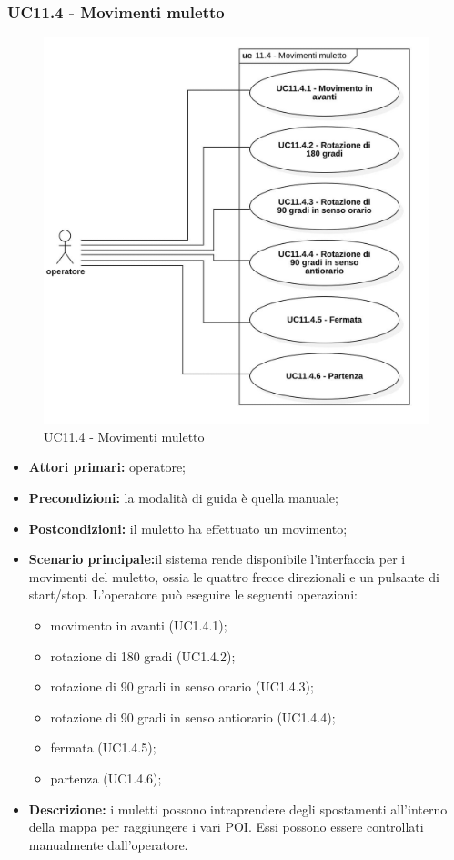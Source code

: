 \subsubsection{UC11.4 - Movimenti muletto}

\begin{figure}[H]
	\centering
	\includegraphics[scale=0.52]{res/images/uc11-4.png}
	\caption{UC11.4 - Movimenti muletto}
\end{figure}

\begin{itemize}
	\item 	\textbf{Attori primari:} operatore;
	\item 	\textbf{Precondizioni:} la modalità di guida è quella manuale;
	\item 	\textbf{Postcondizioni:} il muletto ha effettuato un movimento;
	\item 	\textbf{Scenario principale:}il sistema rende disponibile l'interfaccia per i movimenti del muletto, ossia le quattro frecce direzionali e un pulsante di start/stop. L'operatore può eseguire le seguenti operazioni:
	\begin{itemize}
		\item movimento in avanti (UC1.4.1); 
		\item rotazione di 180 gradi (UC1.4.2);
		\item rotazione di 90 gradi in senso orario (UC1.4.3);
		\item rotazione di 90 gradi in senso antiorario (UC1.4.4);
		\item fermata (UC1.4.5);
		\item partenza (UC1.4.6);
	\end{itemize}
	\item 	\textbf{Descrizione:} i muletti possono intraprendere degli spostamenti all'interno della mappa per raggiungere i vari POI. Essi possono essere controllati manualmente dall'operatore.
\end{itemize}


